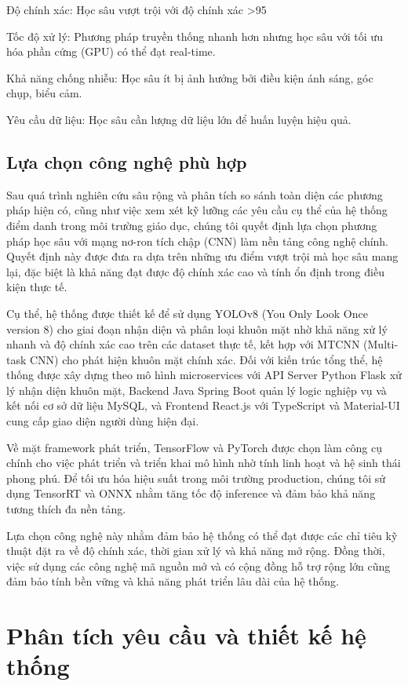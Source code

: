 \documentclass[12pt,a4paper]{report}
\begin{document}
Độ chính xác: Học sâu vượt trội với độ chính xác >95%

Tốc độ xử lý: Phương pháp truyền thống nhanh hơn nhưng học sâu với tối ưu hóa phần cứng (GPU) có thể đạt real-time.

Khả năng chống nhiễu: Học sâu ít bị ảnh hưởng bởi điều kiện ánh sáng, góc chụp, biểu cảm.

Yêu cầu dữ liệu: Học sâu cần lượng dữ liệu lớn để huấn luyện hiệu quả.

\section{Lựa chọn công nghệ phù hợp}
Sau quá trình nghiên cứu sâu rộng và phân tích so sánh toàn diện các phương pháp hiện có, cũng như việc xem xét kỹ lưỡng các yêu cầu cụ thể của hệ thống điểm danh trong môi trường giáo dục, chúng tôi quyết định lựa chọn phương pháp học sâu với mạng nơ-ron tích chập (CNN) làm nền tảng công nghệ chính. Quyết định này được đưa ra dựa trên những ưu điểm vượt trội mà học sâu mang lại, đặc biệt là khả năng đạt được độ chính xác cao và tính ổn định trong điều kiện thực tế.

Cụ thể, hệ thống được thiết kế để sử dụng YOLOv8 (You Only Look Once version 8) cho giai đoạn nhận diện và phân loại khuôn mặt nhờ khả năng xử lý nhanh và độ chính xác cao trên các dataset thực tế, kết hợp với MTCNN (Multi-task CNN) cho phát hiện khuôn mặt chính xác. Đối với kiến trúc tổng thể, hệ thống được xây dựng theo mô hình microservices với API Server Python Flask xử lý nhận diện khuôn mặt, Backend Java Spring Boot quản lý logic nghiệp vụ và kết nối cơ sở dữ liệu MySQL, và Frontend React.js với TypeScript và Material-UI cung cấp giao diện người dùng hiện đại.

Về mặt framework phát triển, TensorFlow và PyTorch được chọn làm công cụ chính cho việc phát triển và triển khai mô hình nhờ tính linh hoạt và hệ sinh thái phong phú. Để tối ưu hóa hiệu suất trong môi trường production, chúng tôi sử dụng TensorRT và ONNX nhằm tăng tốc độ inference và đảm bảo khả năng tương thích đa nền tảng.

Lựa chọn công nghệ này nhằm đảm bảo hệ thống có thể đạt được các chỉ tiêu kỹ thuật đặt ra về độ chính xác, thời gian xử lý và khả năng mở rộng. Đồng thời, việc sử dụng các công nghệ mã nguồn mở và có cộng đồng hỗ trợ rộng lớn cũng đảm bảo tính bền vững và khả năng phát triển lâu dài của hệ thống.

\chapter{Phân tích yêu cầu và thiết kế hệ thống}
\end{document}
